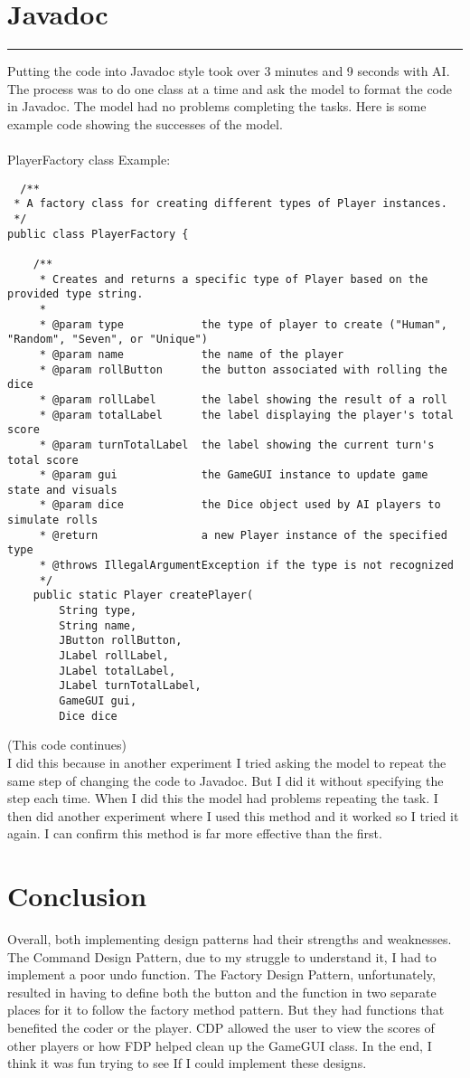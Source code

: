 \documentclass[a4paper,11pt]{article}
\begin{document}
\section{Javadoc}
\hrule
\vspace{10pt} 
Putting the code into Javadoc style took over 3 minutes and 9 seconds with AI. \\
The process was to do one class at a time and ask the model to format the code in Javadoc. The model had no problems completing the tasks. Here is some example code showing the successes of the model.\\\\
PlayerFactory class Example:
\begin{lstlisting}
  /**
 * A factory class for creating different types of Player instances.
 */
public class PlayerFactory {

    /**
     * Creates and returns a specific type of Player based on the provided type string.
     *
     * @param type            the type of player to create ("Human", "Random", "Seven", or "Unique")
     * @param name            the name of the player
     * @param rollButton      the button associated with rolling the dice
     * @param rollLabel       the label showing the result of a roll
     * @param totalLabel      the label displaying the player's total score
     * @param turnTotalLabel  the label showing the current turn's total score
     * @param gui             the GameGUI instance to update game state and visuals
     * @param dice            the Dice object used by AI players to simulate rolls
     * @return                a new Player instance of the specified type
     * @throws IllegalArgumentException if the type is not recognized
     */
    public static Player createPlayer(
        String type,
        String name,
        JButton rollButton,
        JLabel rollLabel,
        JLabel totalLabel,
        JLabel turnTotalLabel,
        GameGUI gui,
        Dice dice
\end{lstlisting} (This code continues)\\
I did this because in another experiment I tried asking the model to repeat the same step of changing the code to Javadoc. But I did it without specifying the step each time. When I did this the model had problems repeating the task. I then did another experiment where I used this method and it worked so I tried it again. I can confirm this method is far more effective than the first. 

\section*{Conclusion}
Overall, both implementing design patterns had their strengths and weaknesses. The Command Design Pattern, due to my struggle to understand it, I had to implement a poor undo function. The Factory Design Pattern, unfortunately, resulted in having to define both the button and the function in two separate places for it to follow the factory method pattern. But they had functions that benefited the coder or the player. CDP allowed the user to view the scores of other players or how FDP helped clean up the GameGUI class. In the end, I think it was fun trying to see If I could implement these designs. 
\end{document}
